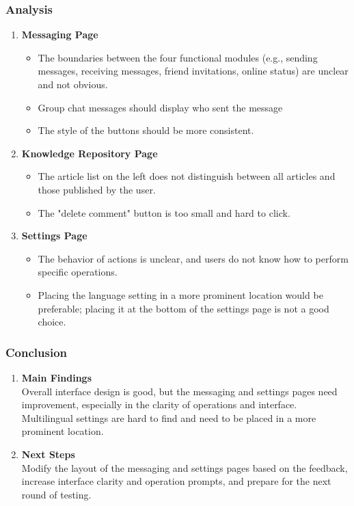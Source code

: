 \documentclass[12pt]{article}
\begin{document}
    \subsubsection*{Analysis}
        \begin{enumerate}
            \item \textbf{Messaging Page}
                \begin{itemize}
                    \item The boundaries between the four functional modules (e.g., sending messages, receiving messages, friend invitations, online status) are unclear and not obvious.
                    \item Group chat messages should display who sent the message
                    \item The style of the buttons should be more consistent.
                \end{itemize}

            \item \textbf{Knowledge Repository Page}
                \begin{itemize}
                    \item The article list on the left does not distinguish between all articles and those published by the user.
                    \item The "delete comment" button is too small and hard to click.
                \end{itemize}

            \item \textbf{Settings Page}
                \begin{itemize}
                    \item The behavior of actions is unclear, and users do not know how to perform specific operations.
                    \item Placing the language setting in a more prominent location would be preferable; placing it at the bottom of the settings page is not a good choice.
                \end{itemize}

        \end{enumerate}


    \subsubsection*{Conclusion}
        \begin{enumerate}
            \item \textbf{Main Findings} \\
            Overall interface design is good, but the messaging and settings pages need improvement, especially in the clarity of operations and interface. Multilingual settings are hard to find and need to be placed in a more prominent location.

            \item \textbf{Next Steps} \\
            Modify the layout of the messaging and settings pages based on the feedback, increase interface clarity and operation prompts, and prepare for the next round of testing.
        \end{enumerate}
\end{document}
